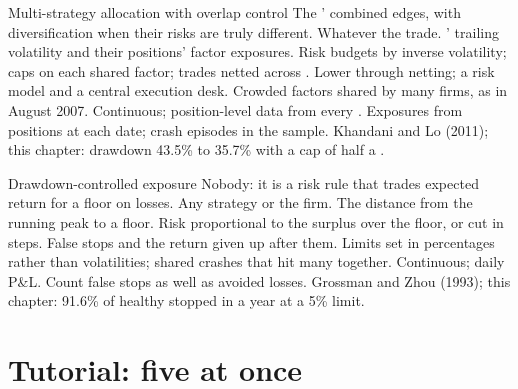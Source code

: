 \begin{strategyfile}{Multi-strategy allocation with overlap control}\label{strat:s1:running-a-multi-strategy-book:overlap}
 The ' combined edges, with diversification when their risks are truly different.
 Whatever the  trade.
 ' trailing volatility and their positions' factor exposures.
 Risk budgets by inverse volatility; caps on each shared factor; trades netted across .
 Lower through netting; a risk model and a central execution desk.
 Crowded factors shared by many firms, as in August 2007.
 Continuous; position-level data from every .
 Exposures from positions at each date; crash episodes in the sample.
 Khandani and Lo (2011); this chapter: drawdown 43.5\% to 35.7\% with a cap of half a .
\end{strategyfile}

\begin{strategyfile}{Drawdown-controlled exposure}\label{strat:s1:running-a-multi-strategy-book:drawdown}
 Nobody: it is a risk rule that trades expected return for a floor on losses.
 Any strategy or the firm.
 The distance from the running peak to a floor.
 Risk proportional to the surplus over the floor, or cut in steps.
 False stops and the return given up after them.
 Limits set in percentages rather than volatilities; shared crashes that hit many  together.
 Continuous; daily P\&L.
 Count false stops as well as avoided losses.
 Grossman and Zhou (1993); this chapter: 91.6\% of healthy  stopped in a year at a 5\% limit.
\end{strategyfile}

\section{Tutorial: five at once}\label{tut:s1:running-a-multi-strategy-book:tut}

